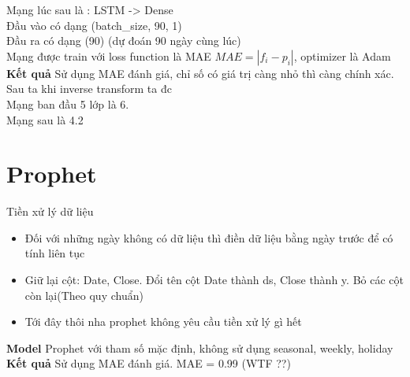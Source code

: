     Mạng lúc sau là : LSTM -> Dense \\
    Đầu vào có dạng (batch\_size, 90, 1) \\
    Đầu ra có dạng (90) (dự đoán 90 ngày cùng lúc) \\
    Mạng được train với loss function là MAE \(MAE = |f_i - p_i|\), optimizer là Adam \\
\textbf{Kết quả}
    Sử dụng MAE đánh giá, chỉ số có giá trị càng nhỏ thì càng chính xác. Sau ta khi inverse transform ta đc \\
    Mạng ban đầu 5 lớp là 6. \\
    Mạng sau là 4.2 \\

\section{Prophet}
Tiền xử lý dữ liệu
\begin{itemize}
    \item Đối với những ngày không có dữ liệu thì điền dữ liệu bằng ngày trước để có tính liên tục \\
    \item Giữ lại cột: Date, Close. Đổi tên cột Date thành ds, Close thành y. Bỏ các cột còn lại(Theo quy chuẩn) \\
    \item Tới đây thôi nha prophet không yêu cầu tiền xử lý gì hết \\
\end{itemize}
\textbf{Model}
Prophet với tham số mặc định, không sử dụng seasonal, weekly, holiday \\
\textbf{Kết quả}
Sử dụng MAE đánh giá. MAE = 0.99 (WTF ??)
